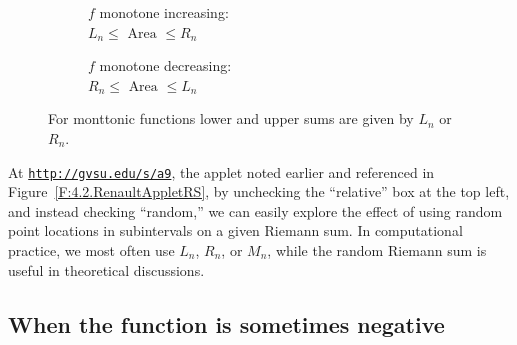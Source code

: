 \begin{figure}
\centering
\begin{subfigure}{.45\textwidth}
  \caption{$ f $ monotone increasing:\\ $ L_n\le \text{ Area } \le R_n $}
  \label{fig:approx_area1}
\end{subfigure}%
\begin{subfigure}{.45\textwidth}
  \caption{$ f $ monotone decreasing:\\ $ R_n\le \text{ Area } \le L_n $}
  \label{fig:approx_area1}
\end{subfigure}%
\caption{For monttonic functions lower and upper sums are given by $ L_n $ or $ R_n $.}
\label{fig:test}
\end{figure}


At \href{http://gvsu.edu/s/a9}{\texttt{http://gvsu.edu/s/a9}}, the applet noted earlier and referenced in Figure~\ref{F:4.2.RenaultAppletRS}, by unchecking the ``relative'' box at the top left, and instead checking ``random,'' we can easily explore the effect of using random point locations in subintervals on a given Riemann sum.  In computational practice, we most often use $L_n$, $R_n$, or $M_n$, while the random Riemann sum is useful in theoretical discussions.  


\subsection*{When the function is sometimes negative}

